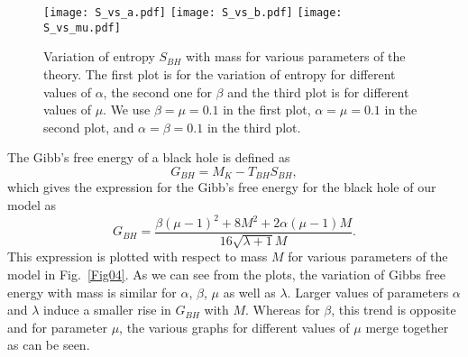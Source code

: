 \documentclass[aps,amsmath,amssymb,showpacs,showkeys]{revtex4}
\begin{document}
\begin{figure}[h!]
\texttt{[image: S\_vs\_a.pdf]}\hspace{0.5cm}
\texttt{[image: S\_vs\_b.pdf]}\vspace{0.2cm}
\texttt{[image: S\_vs\_mu.pdf]}
\caption{ Variation of entropy $S_{BH}$ with mass for various 
parameters of the theory. The first plot is for the variation of entropy 
for different values of $\alpha$, the second one for $\beta$ and the third 
plot is for different values of $\mu$. We use $\beta  = \mu = 0.1$ in the 
first plot, $\alpha = \mu = 0.1$ in the second plot, and 
$\alpha = \beta = 0.1$ in the third plot.}
\label{Fig03}
\end{figure}

The Gibb's free energy of a black hole is defined as \cite{50}
\begin{equation}
 G_{BH}=M_K -T_{BH} S_{BH},
\label{Eq:18}
\end{equation}
which gives the expression for the Gibb's free energy for the black hole
of our model as  
\begin{equation}
 G_{BH}=\frac{\beta (\mu -1)^2+8 M^2+2 \alpha (\mu -1) M}{16 \sqrt{\lambda +1} M}.
\label{Eq:19}
\end{equation}
This expression is plotted with respect to mass $M$ for various 
parameters of the model in Fig.\ \ref{Fig04}. As we can see from the 
plots, the variation of Gibbs free energy with mass is similar for $\alpha$, 
$\beta$, $\mu$ as well as $\lambda$. Larger values of parameters $\alpha$ and 
$\lambda$ induce a smaller rise in $G_{BH}$ with $M$. Whereas for $\beta$, this 
trend is opposite and for parameter $\mu$, the various graphs for different 
values of $\mu$ merge together as can be seen.

\end{document}
